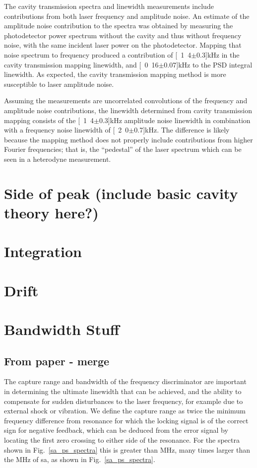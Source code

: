 The cavity transmission spectra and linewidth measurements include contributions from both laser frequency and amplitude noise.
An estimate of the amplitude noise contribution to the spectra was obtained by measuring the photodetector power spectrum without the cavity and thus without frequency noise, with the same incident laser power on the photodetector.
Mapping that noise spectrum to frequency produced a contribution of \unit[1.4$\pm$0.3]{kHz} in the cavity transmission mapping linewidth,  and \unit[0.16$\pm$0.07]{kHz} to the PSD integral linewidth.
As expected, the cavity transmission mapping method is more susceptible to laser amplitude noise. 

Assuming the measurements are uncorrelated convolutions of the frequency and amplitude noise contributions, the linewidth determined from cavity transmission mapping consists of the \unit[1.4$\pm$0.3]{kHz} amplitude noise linewidth in combination with a frequency noise linewidth of \unit[2.0$\pm$0.7]{kHz}.
The difference is likely because the mapping method does not properly include contributions from higher Fourier frequencies; that is, the ``pedestal'' of the laser spectrum which can be seen in a heterodyne measurement.

\section{Side of peak (include basic cavity theory here?)}
\section{Integration}
\section{Drift}
\section{Bandwidth Stuff}
\subsection{From paper - merge}
\label{bandwidth_section}
The capture range and bandwidth of the frequency discriminator are important in determining the ultimate linewidth that can be achieved, and the ability to compensate for sudden disturbances to the laser frequency, for example due to external shock or vibration.
We define the capture range as twice the minimum frequency difference from resonance for which the locking signal is of the correct sign for negative feedback, which can be deduced from the error signal by locating the first zero crossing to either side of the resonance.
For the spectra shown in Fig.~\ref{sa_ps_spectra} this is greater than \unit[300]{MHz}, many times larger than the \unit[16]{MHz} of \gls*{sa}, as shown in Fig.~\ref{sa_ps_spectra}.

